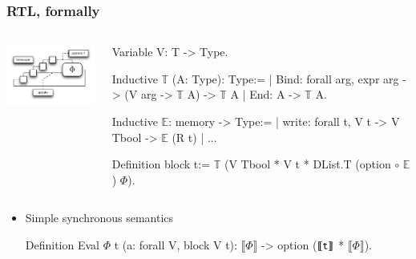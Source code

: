 \documentclass[9pt]{beamer}
\newcommand\denote[1]{\llbracket #1 \rrbracket}
\begin{document}
\begin{frame}[fragile]
  \frametitle{RTL, formally}
  \begin{columns}
\includegraphics[width=5cm]{figs/rtl.pdf}
    
    \begin{coq}
Variable V: T -> Type.       

Inductive $\mathbb T$ (A: Type): Type:=
| Bind: forall arg, expr arg -> (V arg -> $\mathbb T$ A) -> $\mathbb T$ A
| End: A -> $\mathbb T$ A.

Inductive $\mathbb E$: memory -> Type:=
| write: forall t,  V t -> V Tbool -> $\mathbb E$ (R t)
| ...

Definition block t:=
  $\mathbb T$ (V Tbool  * V t  * DList.T (option $\circ$ $\mathbb E$) $\Phi$). 
\end{coq}
  \end{columns}


\begin{itemize}
\item Simple synchronous semantics 
  \begin{coq}
Definition Eval $\Phi$ t (a: forall V, block V t): $\denote\Phi$ -> option ($\denote{\tt t}$ * $\denote\Phi$).
\end{coq}
\end{itemize} 
\end{frame}


\end{document}
